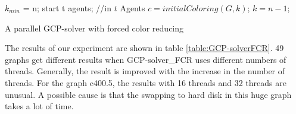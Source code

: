 \documentclass[12pt,a4paper,twoside]{scrartcl}
\numberwithin{equation}{section}
\begin{document}
\begin{algorithm}[H]
$k_{min}$ = n;\;
 start t agents;\;
//in $t$ Agents\;
$c = initialColoring(G,k)$;\;
$k = n-1$;\;
 \caption{A parallel GCP-solver with forced color reducing}
 \end{algorithm} 
 \vspace{20px}
The results of our experiment are shown in table \ref{table:GCP-solverFCR}. 49 graphs get different results when GCP-solver\_FCR uses different numbers of threads. Generally, the result is improved with the increase in the number of threads. For the graph c400.5, the results with 16 threads and 32 threads are unusual. A possible cause is that the swapping to hard disk in this huge graph takes a lot of time.\\
\end{document}
